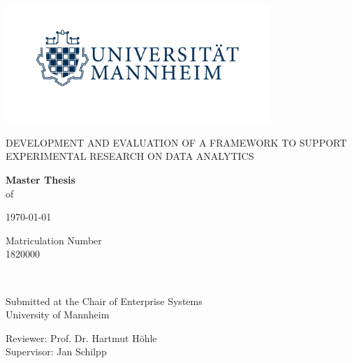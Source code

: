 \begin{titlepage}
	\centering

    \includegraphics[width=10cm]{template/logo_university_of_mannheim_no_bwl.png}\par

	\vspace{1.25cm}
	{\scshape\Large\uppercase{Development and evaluation of a framework to support experimental research on data analytics}\par}
	
	\vspace{2.75cm}
	{\linespread{1}\normalsize \textbf{Master Thesis}\\
	 of  \par}
	
	{\large {}\par}
	
	\vspace{0.5cm}
	{\small \today \par}
	
	\vspace{0.3cm}
	{\footnotesize  Matriculation Number\\
	1820000\par}
	
	\vspace{2cm}
	\hrulefill\\	
	\vspace{1.0cm}
	{\linespread{1}\normalsize Submitted at the Chair of Enterprise Systems\\
	University of Mannheim\par}
	
	\vspace{0.3cm}
	{\linespread{1}\normalsize  Reviewer: Prof. Dr. Hartmut Höhle\\
	Supervisor: Jan Schilpp\par}


\end{titlepage}